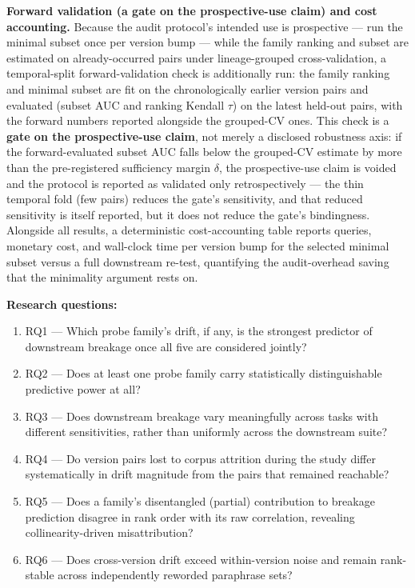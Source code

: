 \documentclass[11pt]{article}
\begin{document}
\textbf{Forward validation (a gate on the prospective-use claim) and cost accounting.} Because the audit protocol's intended use is prospective --- run the minimal subset once per version bump --- while the family ranking and subset are estimated on already-occurred pairs under lineage-grouped cross-validation, a temporal-split forward-validation check is additionally run: the family ranking and minimal subset are fit on the chronologically earlier version pairs and evaluated (subset AUC and ranking Kendall $\tau$) on the latest held-out pairs, with the forward numbers reported alongside the grouped-CV ones. This check is a \textbf{gate on the prospective-use claim}, not merely a disclosed robustness axis: if the forward-evaluated subset AUC falls below the grouped-CV estimate by more than the pre-registered sufficiency margin $\delta$, the prospective-use claim is voided and the protocol is reported as validated only retrospectively --- the thin temporal fold (few pairs) reduces the gate's sensitivity, and that reduced sensitivity is itself reported, but it does not reduce the gate's bindingness. Alongside all results, a deterministic cost-accounting table reports queries, monetary cost, and wall-clock time per version bump for the selected minimal subset versus a full downstream re-test, quantifying the audit-overhead saving that the minimality argument rests on.

\textbf{Research questions:}
\begin{enumerate}[leftmargin=1.6em]
\item RQ1 --- Which probe family's drift, if any, is the strongest predictor of downstream breakage once all five are considered jointly?
\item RQ2 --- Does at least one probe family carry statistically distinguishable predictive power at all?
\item RQ3 --- Does downstream breakage vary meaningfully across tasks with different sensitivities, rather than uniformly across the downstream suite?
\item RQ4 --- Do version pairs lost to corpus attrition during the study differ systematically in drift magnitude from the pairs that remained reachable?
\item RQ5 --- Does a family's disentangled (partial) contribution to breakage prediction disagree in rank order with its raw correlation, revealing collinearity-driven misattribution?
\item RQ6 --- Does cross-version drift exceed within-version noise and remain rank-stable across independently reworded paraphrase sets?
\end{enumerate}
\end{document}
